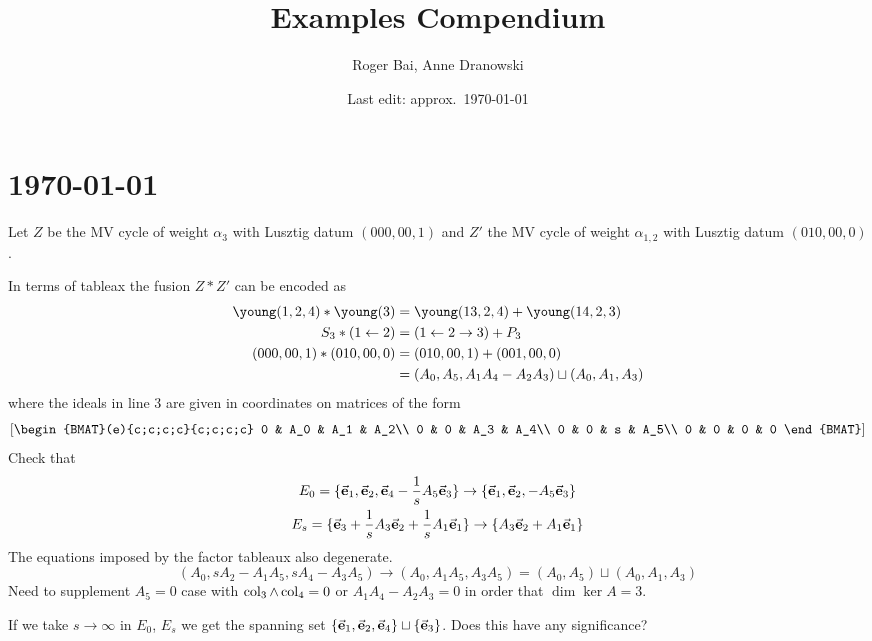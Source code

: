 \documentclass{article}
\title{Examples Compendium}
\author{Roger Bai, Anne Dranowski}
\date{Last edit: approx.\ \today}
\begin{document}
\maketitle
\tableofcontents

\section{\today}
Let $Z$ be the MV cycle of weight $\alpha_3$ with Lusztig datum $(000,00,1)$ and $Z'$ the MV cycle of weight $\alpha_{1,2}$ with Lusztig datum $(010,00,0)$. 

In terms of tableax the fusion $Z\ast Z'$ can be encoded as 
\begin{align}
    \young(1,2,4) \ast \young(3) &= \young(13,2,4) + \young(14,2,3) \\
    S_3 \ast (1\leftarrow 2) &= (1\leftarrow 2 \to 3) + P_3 \\ 
    (000,00,1)\ast (010,00,0) &= (010,00,1) + (001,00,0) \\
    &= (A_0 , A_5, A_1A_4 - A_2A_3) \sqcup (A_0 , A_1, A_3) 
\end{align}
where the ideals in line 3 are given in coordinates on matrices of the form
\[
    \left[\begin{BMAT}(e){c;c;c;c}{c;c;c;c} 
        0 & A_0 & A_1 & A_2\\
        0 & 0 & A_3 & A_4\\
        0 & 0 & s & A_5\\
        0 & 0 & 0 & 0
        \end{BMAT}\right]
\]
Check that 
\[
\begin{gathered}
    E_0 = \{\vec{\mathbf{e}}_1 , \vec{\mathbf{e}}_2 , \vec{\mathbf{e}}_4 - \frac 1 s A_5 \vec{\mathbf{e}}_3 \} \to \{\vec{\mathbf{e}}_1 , \vec{\mathbf{e}}_2 , - A_5 \vec{\mathbf{e}}_3 \} \\
    E_s = \{\vec{\mathbf{e}}_3 + \frac 1 s A_3 \vec{\mathbf{e}}_2 + \frac 1 s A_1 \vec{\mathbf{e}}_1 \} \to \{A_3 \vec{\mathbf{e}}_2 + A_1 \vec{\mathbf{e}}_1 \}
\end{gathered}    
\]
The equations imposed by the factor tableaux also degenerate.
\[
(A_0, sA_2 - A_1 A_5, sA_4 - A_3 A_5) \to (A_0, A_1A_5, A_3A_5) = (A_0,A_5) \sqcup (A_0, A_1, A_3)
\]
Need to supplement $A_5 = 0$ case with $\operatorname{col}_3 \wedge \operatorname{col}_4 = 0$ or $A_1 A_4 - A_2 A_3 = 0$ in order that $\dim \ker A = 3$.

\begin{remark}
    If we take $s\to\infty$ in $E_0$, $E_s$ we get the spanning set $\{\vec{\mathbf{e}}_1,\vec{\mathbf{e}}_2,\vec{\mathbf{e}}_4\}\sqcup\{\vec{\mathbf{e}}_3\}$. Does this have any significance? 
\end{remark}
\end{document}
